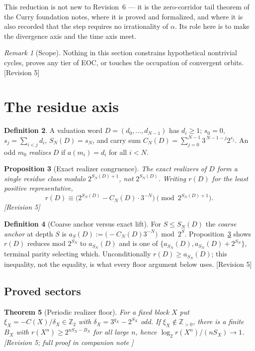 \documentclass[11pt]{article}
\theoremstyle{plain}
\newtheorem{theorem}{Theorem}[section]
\newtheorem{proposition}[theorem]{Proposition}
\theoremstyle{definition}
\newtheorem{definition}[theorem]{Definition}
\theoremstyle{remark}
\newtheorem{remark}[theorem]{Remark}
\newcommand{\Zt}{\mathbb{Z}_2}
\newcommand{\Zpos}{\mathbb{Z}_{>0}}
\newcommand{\al}{\alpha}
\newcommand{\status}[1]{\textsf{\footnotesize[#1]}}
\begin{document}
This reduction is not new to Revision~6 --- it is the zero-corridor tail theorem of the Curry
foundation notes, where it is proved and formalized, and where it is also recorded that the step
requires no irrationality of $\al$. Its role here is to make the divergence axis and the time axis
meet.

\begin{remark}[Scope]
Nothing in this section constrains hypothetical nontrivial cycles, proves any tier of EOC, or
touches the occupation of convergent orbits. \status{Revision 5}
\end{remark}

\section{The residue axis}\label{sec:residue}

\begin{definition}
A valuation word $D=(d_0,\dots,d_{N-1})$ has $d_i\ge1$; $s_0=0$, $s_j=\sum_{i<j}d_i$,
$S_N(D)=s_N$, and carry sum $C_N(D)=\sum_{j=0}^{N-1}3^{\,N-1-j}2^{s_j}$. An odd $m_0$
\emph{realizes} $D$ if $a(m_i)=d_i$ for all $i<N$.
\end{definition}

\begin{proposition}[Exact realizer congruence]\label{prop:congruence}
The exact realizers of $D$ form a single residue class modulo $2^{S_N(D)+1}$, not $2^{S_N(D)}$.
Writing $r(D)$ for the least positive representative,
\[
r(D)\equiv\bigl(2^{S_N(D)}-C_N(D)\cdot3^{-N}\bigr)\pmod{2^{S_N(D)+1}} .
\]
\status{Revision 5}
\end{proposition}

\begin{definition}[Coarse anchor versus exact lift]
For $S\le S_N(D)$ the \emph{coarse anchor} at depth $S$ is
$a_S(D):=\bigl(-C_N(D)3^{-N}\bigr)\bmod 2^S$. Proposition~\ref{prop:congruence} shows $r(D)$
reduces mod $2^{S_N}$ to $a_{S_N}(D)$ and is one of $\{a_{S_N}(D),a_{S_N}(D)+2^{S_N}\}$, terminal
parity selecting which. Unconditionally $r(D)\ge a_{S_N}(D)$; this inequality, not the equality, is
what every floor argument below uses. \status{Revision 5}
\end{definition}

\subsection{Proved sectors}

\begin{theorem}[Periodic realizer floor]\label{thm:periodic}
For a fixed block $X$ put $\xi_X=-C(X)/\delta_X\in\Zt$ with $\delta_X=3^{q_X}-2^{S_X}$ odd. If
$\xi_X\notin\Zpos$, there is a finite $B_X$ with
$r(X^n)\ge 2^{nS_X-B_X}$ for all large $n$, hence $\log_2 r(X^n)/(nS_X)\to1$. \status{Revision 5;
full proof in companion note \cite{DJperiodic}}
\end{theorem}
\end{document}
